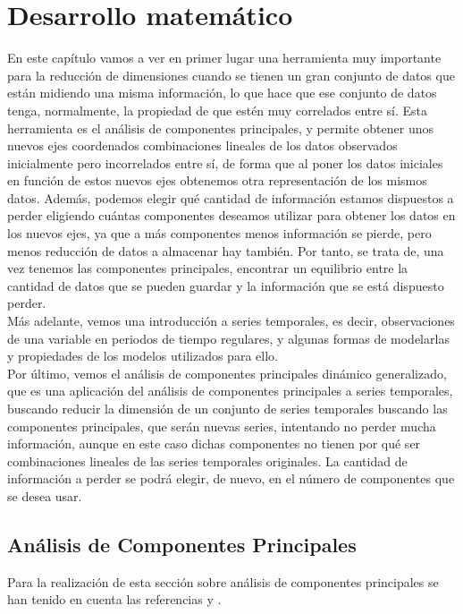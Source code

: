 %
%


\chapter{Desarrollo matemático}
\label{ch:matematicas}

En este capítulo vamos a ver en primer lugar una herramienta muy importante para la reducción de dimensiones cuando se tienen un gran conjunto de datos que están midiendo una misma información, lo que hace que ese conjunto de datos tenga, normalmente, la propiedad de que estén muy correlados entre sí. Esta herramienta es el análisis de componentes principales, y permite obtener unos nuevos ejes coordenados combinaciones lineales de los datos observados inicialmente pero incorrelados entre sí, de forma que al poner los datos iniciales en función de estos nuevos ejes obtenemos otra representación de los mismos datos. Además, podemos elegir qué cantidad de información estamos dispuestos a perder eligiendo cuántas componentes deseamos utilizar para obtener los datos en los nuevos ejes, ya que a más componentes menos información se pierde, pero menos reducción de datos a almacenar hay también. Por tanto, se trata de, una vez tenemos las componentes principales, encontrar un equilibrio entre la cantidad de datos que se pueden guardar y la información que se está dispuesto perder.\\

Más adelante, vemos una introducción a series temporales, es decir, observaciones de una variable en periodos de tiempo regulares, y algunas formas de modelarlas y propiedades de los modelos utilizados para ello.\\

Por último, vemos el análisis de componentes principales dinámico generalizado, que es una aplicación del análisis de componentes principales a series temporales, buscando reducir la dimensión de un conjunto de series temporales buscando las componentes principales, que serán nuevas series, intentando no perder mucha información, aunque en este caso dichas componentes no tienen por qué ser combinaciones lineales de las series temporales originales. La cantidad de información a perder se podrá elegir, de nuevo, en el número de componentes que se desea usar.

\section{Análisis de Componentes Principales}
Para la realización de esta sección sobre análisis de componentes principales se han tenido en cuenta las referencias \cite{anderson} y \cite{sanchez}.\\

